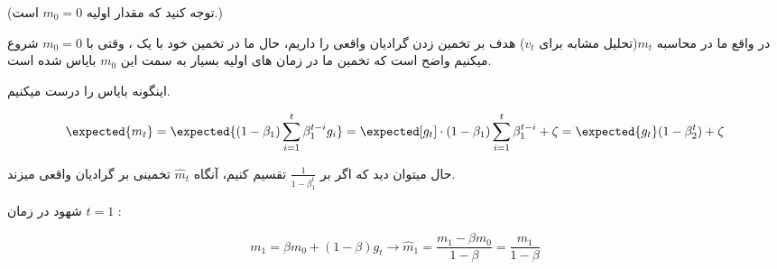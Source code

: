 \begin{enumerate}
{	      (توجه کنید که مقدار اولیه $m_0=0$ است.)

          \begin{qsolve}[]
            در واقع ما در محاسبه $m_t$(تحلیل مشابه برای $v_t$) هدف بر تخمین زدن گرادیان واقعی را داریم، حال ما در تخمین خود با یک
            ، وقتی با $m_0=0$ شروع میکنیم واضح است که تخمین ما در زمان های اولیه بسیار به سمت این $m_0$ بایاس شده است.

            اینگونه بایاس را درست میکنیم.

            \vspace*{-1em}

            \[
              \expected{m_t}=\expected{(1-\beta_1)\sum_{i=1}^{t}\beta_1^{t-i}g_i}=\expected[g_t]\cdot(1-\beta_1)\sum_{i=1}^{t}\beta_1^{t-i} + \zeta = \expected{g_t}(1-\beta_2^t)+\zeta
            \]

            \splitqsolve

            حال میتوان دید که اگر بر $\frac{1}{1-\beta_1^t}$ تقسیم کنیم، آنگاه $\hat{m}_t$ تخمینی بر گرادیان واقعی میزند.

            شهود در زمان $t=1$ : 

            \[
                m_1=\beta m_0 + (1-\beta)g_t \longrightarrow \hat{m}_1=\frac{m_1-\beta m_0}{1-\beta}=\frac{m_1}{1-\beta}  
            \]
          \end{qsolve}
	      }
\end{enumerate}
